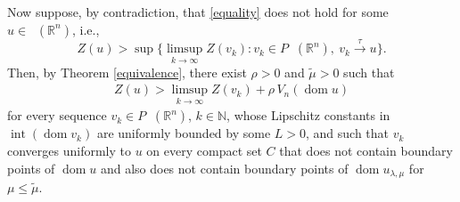 \documentclass[11pt]{article}
\theoremstyle{definition} %
\newcommand{\RR}{(\mathbb{R}^n)}
\DeclareMathOperator{\LQ}{_{l.q}}
\DeclareMathOperator{\dom}{dom}
\DeclareMathOperator{\interior}{int}
\DeclareMathOperator{\LP}{Conv_{lp}}
\newcommand{\seq}{\xrightarrow{\tau}}
\begin{document}
Now suppose, by contradiction, that \eqref{equality} does not hold for some $u\in \LP\RR$, i.e.,
$$
Z(u)>\sup\bigl\{\limsup_{k\rightarrow \infty} Z(v_k): v_k\in P\LQ\RR,\ v_k\seq u\bigl\}.
$$
Then, by Theorem \ref{equivalence}, there exist $\rho>0$  and $\tilde{\mu} >0$ such that
\begin{align}\label{equa21}
    Z(u)> \limsup_{k\rightarrow \infty} Z(v_k)+\rho \, V_n(\dom u)
\end{align}
for every sequence $v_k\in P\LQ\RR$, $k\in\mathbb{N}$, whose Lipschitz constants in 
$\interior(\dom v_k)$ are uniformly bounded by some $L > 0$, and such that 
$v_k$ converges uniformly to $u$ on every compact set $C$ that does not contain 
boundary points of $\dom u$ and also does not contain boundary points of $\dom u_{\lambda,\mu}$ for $\mu \le \tilde{\mu}$.
\end{document}

